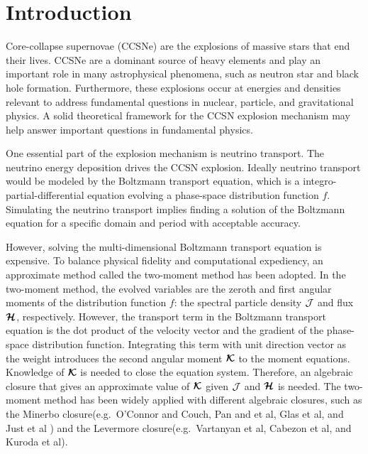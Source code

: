 \section{Introduction}

Core-collapse supernovae (CCSNe) are the explosions of massive stars that end their lives.
CCSNe are a dominant source of heavy elements and play an important role in many astrophysical phenomena, such as neutron star and black hole formation.  
Furthermore, these explosions occur at energies and densities relevant to address fundamental questions in nuclear, particle, and gravitational physics. 
A solid theoretical framework for the CCSN explosion mechanism may help answer important questions in fundamental physics.\rc{[references]}

One essential part of the explosion mechanism is neutrino transport.
The neutrino energy deposition drives the CCSN explosion.  
Ideally neutrino transport would be modeled by the Boltzmann transport equation, which is a integro-partial-differential equation evolving a phase-space distribution function $f$.
Simulating the neutrino transport implies finding a solution of the Boltzmann equation for a specific domain and period with acceptable accuracy.

However, solving the multi-dimensional Boltzmann transport equation is expensive.\rc{[references]}
To balance physical fidelity and computational expediency, an approximate method called the two-moment method has been adopted.\rc{[references]}
In the two-moment method, the evolved variables are the zeroth and first angular moments of the distribution function $f$: the spectral particle density $\mathcal{J}$ and flux $\boldsymbol{\mathcal{H}}$, respectively.
However, the transport term in the Boltzmann transport equation is the dot product of the velocity vector and the gradient of the phase-space distribution function.
Integrating this term with unit direction vector as the weight introduces the second angular moment $\boldsymbol{\mathcal{K}}$ to the moment equations.
Knowledge of $\boldsymbol{\mathcal{K}}$ is needed to close the equation system.
Therefore, an algebraic closure that gives an approximate value of $\boldsymbol{\mathcal{K}}$ given $\mathcal{J}$ and $\boldsymbol{\mathcal{H}}$ is needed.
The two-moment method has been widely applied with different algebraic closures, such as the Minerbo\cite{minerbo_1978} closure(e.g.~{O'Connor} and {Couch}\cite{oConnorCouch_2018}, Pan and et al\cite{pan_etal_2018}, Glas et al\cite{glas_etal_2018}, and Just et al\cite{just_etal_2018} ) and the Levermore\cite{levermore_1984} closure(e.g.~Vartanyan et al\cite{vartanyan_etal_2018}, Cabezon et al\cite{cabezon_etal_2018}, and Kuroda et al\cite{kuroda_etal_2016}). 

